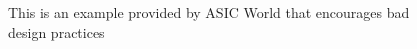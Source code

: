 
\begin{figure}[t]
    \centering
    \caption[
        ASIC World bad example
    ]{
        This is an example provided by ASIC World that encourages bad design practices \cite{asicworld}
    }
    \label{fig:asicworld}
\end{figure}
